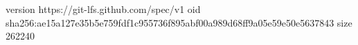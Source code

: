 version https://git-lfs.github.com/spec/v1
oid sha256:ae15a127e35b5e759fdf1c955736f895abf00a989d68ff9a05e59e50e5637843
size 262240
